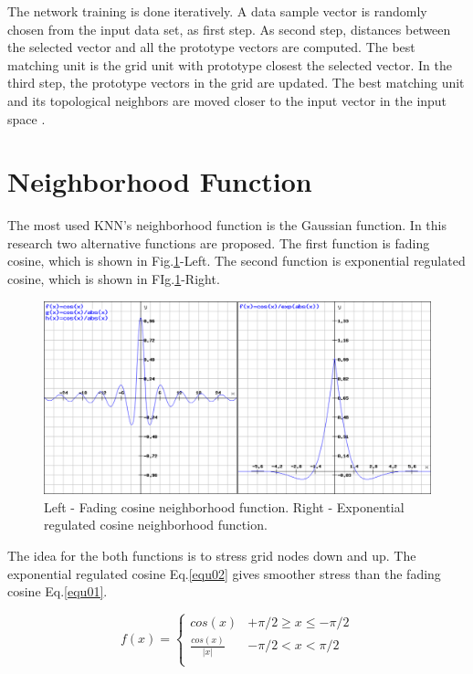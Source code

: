 \documentclass[runningheads]{llncs}
\begin{document}
The network training is done iteratively. A data sample vector is randomly chosen from the input data set, as first step. As second step, distances between the selected vector and all the prototype vectors are computed. The best matching unit is the grid unit with prototype closest the selected vector. In the third step, the prototype vectors in the grid are updated. The best matching unit and its topological neighbors are moved closer to the input vector in the input space \cite{vesanto01,аmerijckx01}.

\section{Neighborhood Function}

The most used KNN's neighborhood function is the Gaussian function. In this research two alternative functions are proposed. The first function is fading cosine, which is shown in Fig.\ref{fig01}-Left. The second function is exponential regulated cosine, which is shown in FIg.\ref{fig01}-Right.

\begin{figure}
\includegraphics[width=1.0\textwidth]{fig01.png}
\centering
\caption{Left - Fading cosine neighborhood function. Right - Exponential regulated cosine neighborhood function.} \label{fig01}
\end{figure}
\FloatBarrier

The idea for the both functions is to stress grid nodes down and up. The exponential regulated cosine Eq.\ref{equ02} gives smoother stress than the fading cosine Eq.\ref{equ01}. 

\begin{equation} \label{equ01}
f(x) = 
	\begin{cases} 
		cos(x) & +\pi/2 \geq x \leq -\pi/2 \\
		\frac{cos(x)}{|x|} & -\pi/2 < x < \pi/2 \\
	\end{cases}
\end{equation}
\end{document}
